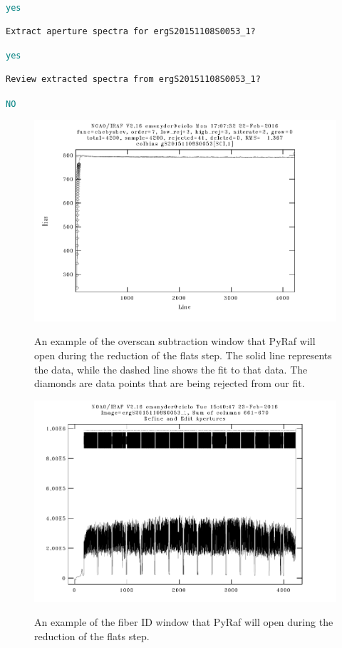 \documentclass[12pt]{report}
\newcommand{\ty}[1]{\textcolor{teal}{\texttt{#1}}}
\begin{document}
\begin{enumerate}
\ty{yes}

\begin{verbatim}
Extract aperture spectra for ergS20151108S0053_1?
\end{verbatim}

\ty{yes}

\begin{verbatim}
Review extracted spectra from ergS20151108S0053_1?
\end{verbatim}

\ty{NO}

\end{enumerate}

\begin{figure}[h]
\centering
\includegraphics{overscan_example}
\label{fig:overscan}
\caption[Overscan Subtraction Example]{An example of the overscan subtraction window that PyRaf will open during the reduction of the flats step. The solid line represents the data, while the dashed line shows the fit to that data. The diamonds are data points that are being rejected from our fit.}
\end{figure}

\begin{figure}[h]
\centering
\includegraphics{apertures1}
\label{fig:ap1}
\caption[Zoomed Out Fiber ID Example]{An example of the fiber ID window that PyRaf will open during the reduction of the flats step.}
\end{figure}
\end{document}
